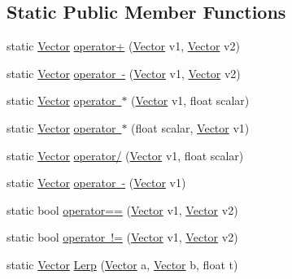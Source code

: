 \subsection*{Static Public Member Functions}
\begin{DoxyCompactItemize}
\item 
static \mbox{\hyperlink{struct_leap_1_1_vector}{Vector}} \mbox{\hyperlink{struct_leap_1_1_vector_af056d6d462839c1e5d3d9fa7d0507f11}{operator+}} (\mbox{\hyperlink{struct_leap_1_1_vector}{Vector}} v1, \mbox{\hyperlink{struct_leap_1_1_vector}{Vector}} v2)
\item 
static \mbox{\hyperlink{struct_leap_1_1_vector}{Vector}} \mbox{\hyperlink{struct_leap_1_1_vector_ac35b7560d4ac5acb9217120aa6281f41}{operator -\/}} (\mbox{\hyperlink{struct_leap_1_1_vector}{Vector}} v1, \mbox{\hyperlink{struct_leap_1_1_vector}{Vector}} v2)
\item 
static \mbox{\hyperlink{struct_leap_1_1_vector}{Vector}} \mbox{\hyperlink{struct_leap_1_1_vector_a9189471d23ea61609806cbee7b1808bf}{operator $\ast$}} (\mbox{\hyperlink{struct_leap_1_1_vector}{Vector}} v1, float scalar)
\item 
static \mbox{\hyperlink{struct_leap_1_1_vector}{Vector}} \mbox{\hyperlink{struct_leap_1_1_vector_a7a1839d6ea30d92eb3a7591b73c41a63}{operator $\ast$}} (float scalar, \mbox{\hyperlink{struct_leap_1_1_vector}{Vector}} v1)
\item 
static \mbox{\hyperlink{struct_leap_1_1_vector}{Vector}} \mbox{\hyperlink{struct_leap_1_1_vector_a8a707fa512d65682a773f87308c6d0e9}{operator/}} (\mbox{\hyperlink{struct_leap_1_1_vector}{Vector}} v1, float scalar)
\item 
static \mbox{\hyperlink{struct_leap_1_1_vector}{Vector}} \mbox{\hyperlink{struct_leap_1_1_vector_ab08ec541871ec6fefb7f66331fdb6f0d}{operator -\/}} (\mbox{\hyperlink{struct_leap_1_1_vector}{Vector}} v1)
\item 
static bool \mbox{\hyperlink{struct_leap_1_1_vector_ae3811a09e999d99576d40d361d5871fd}{operator==}} (\mbox{\hyperlink{struct_leap_1_1_vector}{Vector}} v1, \mbox{\hyperlink{struct_leap_1_1_vector}{Vector}} v2)
\item 
static bool \mbox{\hyperlink{struct_leap_1_1_vector_a6c834842a05008442e86353a7209d17b}{operator !=}} (\mbox{\hyperlink{struct_leap_1_1_vector}{Vector}} v1, \mbox{\hyperlink{struct_leap_1_1_vector}{Vector}} v2)
\item 
static \mbox{\hyperlink{struct_leap_1_1_vector}{Vector}} \mbox{\hyperlink{struct_leap_1_1_vector_a5732837cc5c84d689d44d9f3836fe639}{Lerp}} (\mbox{\hyperlink{struct_leap_1_1_vector}{Vector}} a, \mbox{\hyperlink{struct_leap_1_1_vector}{Vector}} b, float t)
\end{DoxyCompactItemize}
